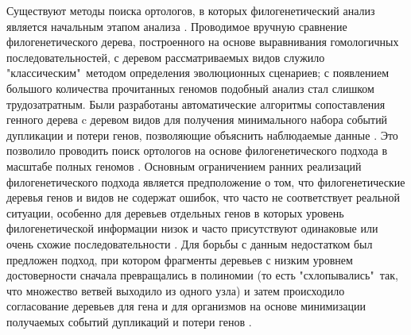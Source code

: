 Существуют методы поиска ортологов, в которых филогенетический анализ является начальным этапом анализа \cite{gabaldon2008large}. Проводимое вручную сравнение филогенетического дерева, построенного на основе выравнивания гомологичных последовательностей, с деревом рассматриваемых видов служило "классическим"\ методом определения эволюционных сценариев; с появлением большого количества прочитанных геномов подобный анализ стал слишком трудозатратным. Были разработаны автоматические алгоритмы сопоставления генного дерева c деревом видов для получения минимального набора событий дупликации и потери генов, позволяющие объяснить наблюдаемые данные \cite{goodman1979fitting}. Это позволило проводить поиск ортологов на основе филогенетического подхода в масштабе полных геномов \cite{wapinski2007automatic}. Основным ограничением ранних реализаций филогенетического подхода является предположение о том, что филогенетические деревья генов и видов не содержат ошибок, что часто не соответствует реальной ситуации, особенно для деревьев отдельных генов в которых уровень филогенетической информации низок и часто присутствуют одинаковые или очень схожие последовательности \cite{rasmussen2007accurate}. Для борьбы с данным недостатком был предложен подход, при котором фрагменты деревьев с низким уровнем достоверности сначала превращались в полиномии (то есть "схлопывались"\ так, что множество ветвей выходило из одного узла) и затем происходило согласование деревьев для гена и для организмов на основе минимизации получаемых событий дупликаций и потери генов \cite{berglund2006optimal}. 


